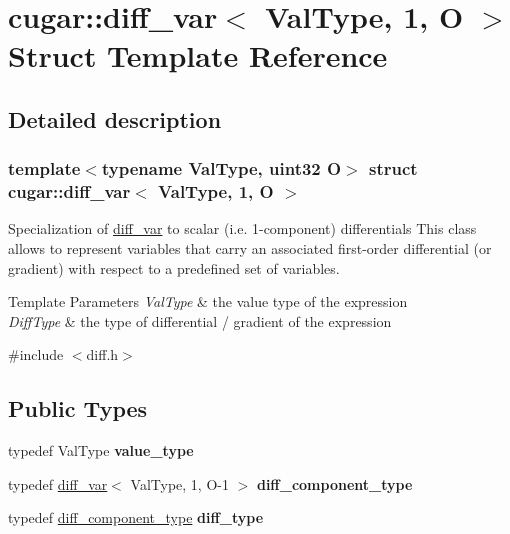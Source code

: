 \hypertarget{structcugar_1_1diff__var_3_01_val_type_00_011_00_01_o_01_4}{}\section{cugar\+:\+:diff\+\_\+var$<$ Val\+Type, 1, O $>$ Struct Template Reference}
\label{structcugar_1_1diff__var_3_01_val_type_00_011_00_01_o_01_4}


\subsection{Detailed description}
\subsubsection*{template$<$typename Val\+Type, uint32 O$>$\newline
struct cugar\+::diff\+\_\+var$<$ Val\+Type, 1, O $>$}

Specialization of \hyperlink{structcugar_1_1diff__var}{diff\+\_\+var} to scalar (i.\+e. 1-\/component) differentials This class allows to represent variables that carry an associated first-\/order differential (or gradient) with respect to a predefined set of variables.


\begin{DoxyTemplParams}{Template Parameters}
{\em Val\+Type} & the value type of the expression \\
\hline
{\em Diff\+Type} & the type of differential / gradient of the expression \\
\hline
\end{DoxyTemplParams}


{\ttfamily \#include $<$diff.\+h$>$}

\subsection*{Public Types}
\begin{DoxyCompactItemize}
\item 
\mbox{\label{structcugar_1_1diff__var_3_01_val_type_00_011_00_01_o_01_4_ac782f71eda02c127a2f33f85cebad063}} 
typedef Val\+Type {\bfseries value\+\_\+type}
\item 
\mbox{\label{structcugar_1_1diff__var_3_01_val_type_00_011_00_01_o_01_4_aa69d72fd1f39fe0b99fbf645970189c3}} 
typedef \hyperlink{structcugar_1_1diff__var}{diff\+\_\+var}$<$ Val\+Type, 1, O-\/1 $>$ {\bfseries diff\+\_\+component\+\_\+type}
\item 
\mbox{\label{structcugar_1_1diff__var_3_01_val_type_00_011_00_01_o_01_4_afadcb49f5a128ec803483701858d7bd4}} 
typedef \hyperlink{structcugar_1_1diff__var}{diff\+\_\+component\+\_\+type} {\bfseries diff\+\_\+type}
\end{DoxyCompactItemize}
